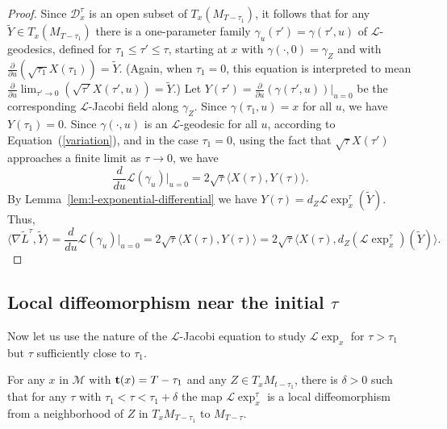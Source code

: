 \begin{proof}
Since ${\mathcal D}^{\tau}_x$ is an open subset of $T_x(M_{T-\tau_1})$, it
follows that for any $\widetilde Y\in T_x(M_{T-\tau_1})$ there is a
one-parameter family $\gamma_u(\tau')=\gamma(\tau',u)$ of
 ${\mathcal L}$-geodesics, defined for $\tau_1\le \tau'\le \tau$,
starting at $x$ with $\gamma(\cdot,0)=\gamma_Z$ and with
$\frac{\partial}{\partial u}\left(\sqrt{\tau_1}X(\tau_1)\right)=\widetilde Y$.
(Again, when $\tau_1=0$, this equation is interpreted to mean
$\frac{\partial}{\partial u}\lim_{\tau'\rightarrow
0}(\sqrt{\tau'}X(\tau',u))=\widetilde Y$.) Let
$Y(\tau')=\frac{\partial}{\partial u}(\gamma(\tau',u))|_{u=0}$ be the
corresponding ${\mathcal L}$-Jacobi field along $\gamma_Z$. Since
$\gamma(\tau_1,u)=x$ for all $u$, we have $Y(\tau_1)=0$. Since
$\gamma(\cdot,u)$ is an ${\mathcal L}$-geodesic for all $u$, according to
Equation~(\ref{variation}), and in the case $\tau_1=0$, using the fact that
$\sqrt{\tau}X(\tau')$ approaches a finite limit as $\tau\rightarrow 0$, we have
$$\frac{d}{du}{\mathcal
L}(\gamma_u)|_{u=0}=2\sqrt{\tau}\langle X(\tau),Y(\tau)\rangle.$$ By
Lemma~\ref{lem:l-exponential-differential} we have $Y(\tau)=d_Z{\mathcal L}\exp_x^{\tau}(\tilde
Y)$. Thus,
$$\langle\nabla\widetilde L^{\tau},\widetilde Y\rangle=\frac{d}{du}{\mathcal
L}(\gamma_u)|_{u=0}=2\sqrt{\tau}\langle
X(\tau),Y(\tau)\rangle=2\sqrt{\tau}\langle X(\tau),d_Z({\mathcal
L}\exp^{\tau}_x)(\widetilde Y)\rangle.$$
\end{proof}


\subsection{Local diffeomorphism near the initial $\tau$}

Now let us use the nature of the ${\mathcal L}$-Jacobi equation to
study ${\mathcal L}\exp_x$ for $\tau>\tau_1$ but $\tau$
sufficiently close to $\tau_1$.

\begin{lemma}\label{lem:l-exponential-local-diffeomorphism}
\label{locstr}
For any $x$ in ${\mathcal M}$ with ${\bf
t}(x)=T-\tau_1$ and any $Z\in T_xM_{t-\tau_1}$, there is $\delta>0$
such that for any $\tau$ with $\tau_1<\tau<\tau_1+\delta$ the map
${\mathcal L}\exp_x^{\tau}$ is a local diffeomorphism from a
neighborhood of $Z$ in $T_xM_{T-\tau_1}$ to $M_{T-\tau}$.
\end{lemma}

